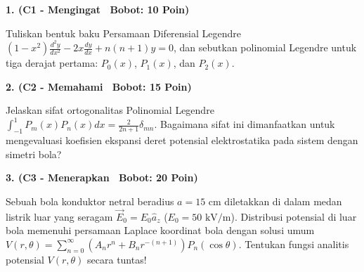 \documentclass[10pt,a4paper]{article}
\begin{document}
\par
\vspace{1mm}

\noindent\textbf{1. (C1 - Mengingat \textbar\ Bobot: 10 Poin)}\par\vspace{0.8mm}
{\footnotesize Tuliskan bentuk baku Persamaan Diferensial Legendre $(1 - x^2) \frac{d^2 y}{dx^2} - 2x \frac{dy}{dx} + n(n+1)y = 0$, dan sebutkan polinomial Legendre untuk tiga derajat pertama: $P_0(x)$, $P_1(x)$, dan $P_2(x)$.}\par

\vspace{2.5mm}

\noindent\textbf{2. (C2 - Memahami \textbar\ Bobot: 15 Poin)}\par\vspace{0.8mm}
{\footnotesize Jelaskan sifat ortogonalitas Polinomial Legendre $\int_{-1}^1 P_m(x) P_n(x) dx = \frac{2}{2n+1} \delta_{mn}$. Bagaimana sifat ini dimanfaatkan untuk mengevaluasi koefisien ekspansi deret potensial elektrostatika pada sistem dengan simetri bola?}\par

\vspace{2.5mm}

\noindent\textbf{3. (C3 - Menerapkan \textbar\ Bobot: 20 Poin)}\par\vspace{0.8mm}
\noindent\begin{minipage}[t]{0.60\textwidth}%
  {\footnotesize Sebuah bola konduktor netral beradius $a = 15\text{ cm}$ diletakkan di dalam medan listrik luar yang seragam $\vec{E}_0 = E_0 \hat{a}_z$ ($E_0 = 50\text{ kV/m}$). Distribusi potensial di luar bola memenuhi persamaan Laplace koordinat bola dengan solusi umum $V(r,\theta) = \sum_{n=0}^\infty (A_n r^n + B_n r^{-(n+1)}) P_n(\cos\theta)$. Tentukan fungsi analitis potensial $V(r,\theta)$ secara tuntas!}%
\end{minipage}%
\hfill%
\begin{minipage}[t]{0.37\textwidth}%
  \centering
\end{minipage}\par
\end{document}
